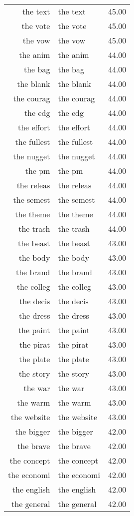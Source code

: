 \begin{table}[ht]
\begin{tabular}{rlr}
  the text & the text & 45.00 \\ 
  the vote & the vote & 45.00 \\ 
  the vow & the vow & 45.00 \\ 
  the anim & the anim & 44.00 \\ 
  the bag & the bag & 44.00 \\ 
  the blank & the blank & 44.00 \\ 
  the courag & the courag & 44.00 \\ 
  the edg & the edg & 44.00 \\ 
  the effort & the effort & 44.00 \\ 
  the fullest & the fullest & 44.00 \\ 
  the nugget & the nugget & 44.00 \\ 
  the pm & the pm & 44.00 \\ 
  the releas & the releas & 44.00 \\ 
  the semest & the semest & 44.00 \\ 
  the theme & the theme & 44.00 \\ 
  the trash & the trash & 44.00 \\ 
  the beast & the beast & 43.00 \\ 
  the body & the body & 43.00 \\ 
  the brand & the brand & 43.00 \\ 
  the colleg & the colleg & 43.00 \\ 
  the decis & the decis & 43.00 \\ 
  the dress & the dress & 43.00 \\ 
  the paint & the paint & 43.00 \\ 
  the pirat & the pirat & 43.00 \\ 
  the plate & the plate & 43.00 \\ 
  the story & the story & 43.00 \\ 
  the war & the war & 43.00 \\ 
  the warm & the warm & 43.00 \\ 
  the website & the website & 43.00 \\ 
  the bigger & the bigger & 42.00 \\ 
  the brave & the brave & 42.00 \\ 
  the concept & the concept & 42.00 \\ 
  the economi & the economi & 42.00 \\ 
  the english & the english & 42.00 \\ 
  the general & the general & 42.00 \\ 

\end{tabular}
\end{table}
